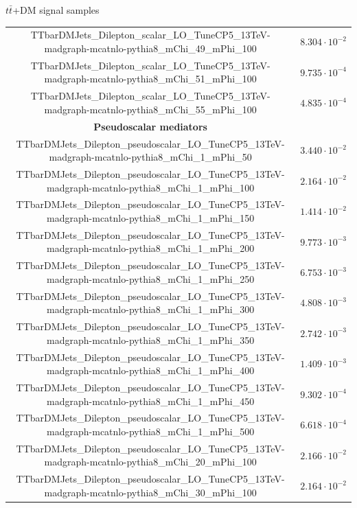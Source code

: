 \documentclass[8pt]{beamer}
\begin{document}
\begin{frame}{$t \bar t$+DM signal samples}
\begin{table}
\begin{center}
{\begin{tabular}{ c|c }
 TTbarDMJets\_Dilepton\_scalar\_LO\_TuneCP5\_13TeV-madgraph-mcatnlo-pythia8\_mChi\_49\_mPhi\_100 & $8.304 \cdot 10^{-2}$ \\
 TTbarDMJets\_Dilepton\_scalar\_LO\_TuneCP5\_13TeV-madgraph-mcatnlo-pythia8\_mChi\_51\_mPhi\_100 & $9.735 \cdot 10^{-4}$ \\
 TTbarDMJets\_Dilepton\_scalar\_LO\_TuneCP5\_13TeV-madgraph-mcatnlo-pythia8\_mChi\_55\_mPhi\_100 & $4.835 \cdot 10^{-4}$ \\
 \hline
\textbf{Pseudoscalar mediators} & \\
 TTbarDMJets\_Dilepton\_pseudoscalar\_LO\_TuneCP5\_13TeV-madgraph-mcatnlo-pythia8\_mChi\_1\_mPhi\_50 & $3.440 \cdot 10^{-2}$ \\
 TTbarDMJets\_Dilepton\_pseudoscalar\_LO\_TuneCP5\_13TeV-madgraph-mcatnlo-pythia8\_mChi\_1\_mPhi\_100 & $2.164 \cdot 10^{-2}$ \\
 TTbarDMJets\_Dilepton\_pseudoscalar\_LO\_TuneCP5\_13TeV-madgraph-mcatnlo-pythia8\_mChi\_1\_mPhi\_150 & $1.414 \cdot 10^{-2}$ \\
 TTbarDMJets\_Dilepton\_pseudoscalar\_LO\_TuneCP5\_13TeV-madgraph-mcatnlo-pythia8\_mChi\_1\_mPhi\_200 & $9.773 \cdot 10^{-3}$ \\
 TTbarDMJets\_Dilepton\_pseudoscalar\_LO\_TuneCP5\_13TeV-madgraph-mcatnlo-pythia8\_mChi\_1\_mPhi\_250 & $6.753 \cdot 10^{-3}$ \\
 TTbarDMJets\_Dilepton\_pseudoscalar\_LO\_TuneCP5\_13TeV-madgraph-mcatnlo-pythia8\_mChi\_1\_mPhi\_300 & $4.808 \cdot 10^{-3}$ \\
 TTbarDMJets\_Dilepton\_pseudoscalar\_LO\_TuneCP5\_13TeV-madgraph-mcatnlo-pythia8\_mChi\_1\_mPhi\_350 & $2.742 \cdot 10^{-3}$ \\
 TTbarDMJets\_Dilepton\_pseudoscalar\_LO\_TuneCP5\_13TeV-madgraph-mcatnlo-pythia8\_mChi\_1\_mPhi\_400 & $1.409 \cdot 10^{-3}$ \\
 TTbarDMJets\_Dilepton\_pseudoscalar\_LO\_TuneCP5\_13TeV-madgraph-mcatnlo-pythia8\_mChi\_1\_mPhi\_450 & $9.302 \cdot 10^{-4}$ \\
 TTbarDMJets\_Dilepton\_pseudoscalar\_LO\_TuneCP5\_13TeV-madgraph-mcatnlo-pythia8\_mChi\_1\_mPhi\_500 & $6.618 \cdot 10^{-4}$ \\
 TTbarDMJets\_Dilepton\_pseudoscalar\_LO\_TuneCP5\_13TeV-madgraph-mcatnlo-pythia8\_mChi\_20\_mPhi\_100 & $2.166 \cdot 10^{-2}$ \\
 TTbarDMJets\_Dilepton\_pseudoscalar\_LO\_TuneCP5\_13TeV-madgraph-mcatnlo-pythia8\_mChi\_30\_mPhi\_100 & $2.164 \cdot 10^{-2}$ \\

\end{tabular}}
\end{center}
\end{table}
\end{frame}
\end{document}

